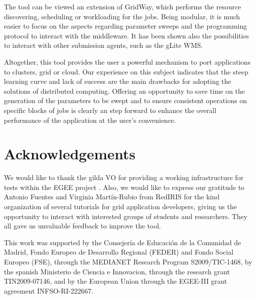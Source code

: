 \documentclass[12pt,a4paper]{article}
\begin{document}
The tool can be viewed an extension of GridWay, which performs the resource discovering, scheduling or workloading for the jobs. Being modular, it is much easier to focus on the aspects regarding parameter sweeps and the programming protocol to interact with the middleware. It has been shown also the possibilities to interact with other submission agents, such as the gLite WMS.

Altogether, this tool provides the user a powerful mechanism to port applications to clusters, grid or cloud. Our experience on this subject indicates that the steep learning curve and lack of success are the main drawbacks for adopting the solutions of distributed computing. Offering an opportunity to save time on the generation of the parameters to be swept and to ensure consistent operations on specific blocks of jobs is clearly an step forward to enhance the overall performance of the application at the user's convenience.


\section*{Acknowledgements}
We would like to thank the gilda VO \cite{gilda} for providing a working infrastructure for tests within the EGEE project \cite{EGEE}. Also, we would like to express our gratitude to Antonio Fuentes and Virginia Martín-Rubio from RedIRIS for the kind organization of several tutorials for grid application developers, giving us the opportunity to interact with interested groups of students and researchers. They all gave us unvaluable feedback to improve the tool. 

This work was supported by the Consejería de Educación de la Comunidad de Madrid, Fondo Europeo de Desarrollo Regional (FEDER) and Fondo Social Europeo (FSE), through the MEDIANET Research Program S2009/TIC-1468, by the spanish Ministerio de Ciencia e Innovacion, through the research grant TIN2009-07146, and by the European Union through the EGEE-III grant agreement INFSO-RI-222667.
 
\end{document}

